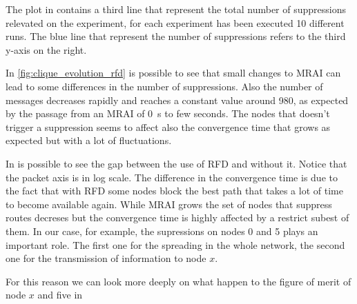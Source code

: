 The plot in  contains a third line that represent 
the total number of suppressions relevated on the experiment, for each experiment
has been executed \num{10} different runs.
The blue line that represent the number of suppressions refers to the third y-axis
on the right.

In \cref{fig:clique_evolution_rfd} is possible to see that small changes to \ac{MRAI}
can lead to some differences in the number of suppressions.
Also the number of messages decreases rapidly and reaches a constant 
value around 980, as expected by the passage from an \ac{MRAI} of \SI{0}{\second}
to few seconds.
The nodes that doesn't trigger a suppression seems to affect also the
convergence time that grows as expected but with a lot of fluctuations.

In  is possible to see the
gap between the use of \ac{RFD} and without it.
Notice that the packet axis is in log scale.
The difference in the convergence time is due to the fact that with \ac{RFD} some
nodes block the best path that takes a lot of time to become available again.
While \ac{MRAI} grows the set of nodes that suppress routes decreses but the
convergence time is highly affected by a restrict subest of them.
In our case, for example, the supressions on nodes \num{0} and \num{5} plays
an important role.
The first one for the spreading in the whole network, the second one for the
transmission of information to node $x$.

For this reason we can look more deeply on what happen to the figure of merit
of node $x$ and five in 

